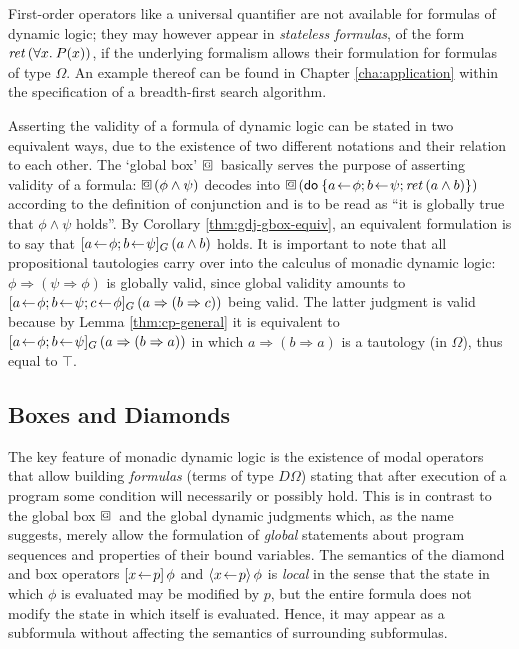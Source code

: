 First-order operators like a universal quantifier are not available for formulas
of dynamic logic; they may however appear in \emph{stateless formulas}, \EG of
the form $\mathit{ret\,} (\forall x.\: P(x))$, if the underlying formalism allows their
formulation for formulas of type $\Omega$. An example thereof can be found in Chapter
\ref{cha:application} within the specification of a breadth-first search
algorithm.

Asserting the validity of a formula of dynamic logic can be stated in two
equivalent ways, due to the existence of two different notations and their
relation to each other. The `global box' $\gbox$ basically serves the purpose of
asserting validity of a formula: $\gbox(\phi\land\psi)$ decodes into
$\gbox(\DoStmt{a\leteq \phi; b\leteq \psi; \ret (a\land b)})$ according to the definition
of conjunction and is to be read as ``it is globally true that $\phi \land \psi$ holds''.
By Corollary \ref{thm:gdj-gbox-equiv}, an equivalent formulation is to say that
$[a\!\gets\! \phi; b\!\gets\! \psi]_G\,(a\land b)$ holds. It is important to note that all
propositional tautologies carry over into the calculus of monadic dynamic logic:
$\phi \Rightarrow (\psi \Rightarrow \phi)$ is globally valid, since global validity amounts to $[a\!\gets\!
  \phi; b\!\gets\! \psi; c\!\gets\! \phi]_G\,(a \Rightarrow (b \Rightarrow c))$ being valid. The latter judgment is
valid because by Lemma \ref{thm:cp-general} it is equivalent to $[a\!\gets\! \phi;
  b\!\gets\! \psi]_G\,(a \Rightarrow (b \Rightarrow a))$ in which $a \Rightarrow (b \Rightarrow a)$ is a tautology (in $\Omega$), thus
equal to $\top$.


\subsection{Boxes and Diamonds}
\label{sec:box-diamond}

The key feature of monadic dynamic logic is the existence of modal operators
that allow building \emph{formulas} (\IE terms of type $D\Omega$) stating that after
execution of a program some condition will necessarily or possibly hold. This is
in contrast to the global box $\gbox$ and the global dynamic judgments which, as
the name suggests, merely allow the formulation of \emph{global} statements
about program sequences and properties of their bound variables. The semantics
of the diamond and box operators $[x\!\gets\! p]\,{\phi}$ and $\langle x\!\gets\!
  p\rangle\,{\phi}$ is \emph{local} in the sense that the state in which $\phi$ is evaluated
may be modified by $p$, but the entire formula does not modify the state in
which itself is evaluated. Hence, it may appear as a subformula without
affecting the semantics of surrounding subformulas.

